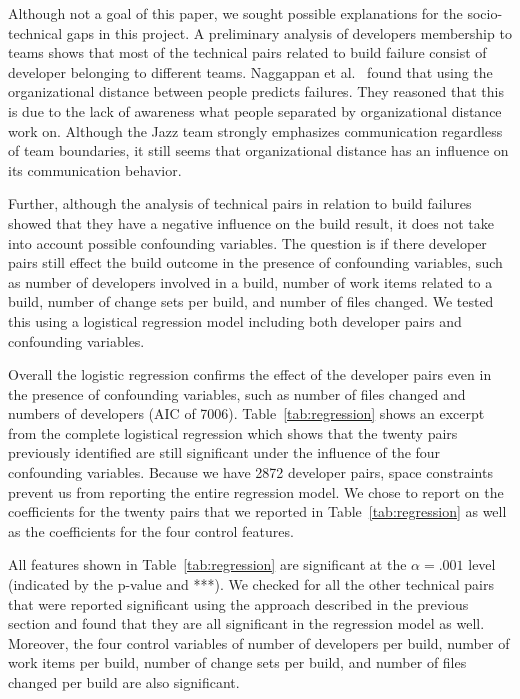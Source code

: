 Although not a goal of this paper, we sought possible explanations for the
socio-technical gaps in this project. A preliminary analysis of developers
membership to teams shows that most
of the technical pairs related to build failure consist of developer belonging to
different teams. Naggappan et al.~\cite{nagappan:icse:2008} found that using the
organizational distance between people predicts failures. They reasoned that this
is due to the lack of awareness what people separated by organizational distance
work on. Although the Jazz team strongly emphasizes communication
regardless of team boundaries, it still seems that organizational distance has
an influence on its communication behavior.

Further, although the analysis of technical pairs in relation to build failures
showed that they have a negative influence on the build result, it does not take
into account possible confounding variables. The question is if there developer pairs still effect the build outcome in the presence of confounding variables, such as number of developers involved in a build, number of work items
related to a build, number of change sets per build, and number of files changed.
We tested this using a logistical regression model including both developer pairs and confounding variables.

Overall the logistic regression confirms the effect of the developer pairs
even in the presence of confounding variables, such as number of files changed
and numbers of developers (AIC of 7006). 
Table~\ref{tab:regression} shows an excerpt from the complete logistical
regression which shows that the twenty pairs previously identified are still
significant under the influence of the four confounding variables. Because we have 2872 developer pairs, space constraints prevent us from reporting the entire regression model. We chose to report on the coefficients for the twenty pairs that we reported in Table~\ref{tab:regression} as well as the coefficients for the four control features.

All features shown in Table~\ref{tab:regression} are significant at the $\alpha=.001$ level (indicated by the p-value and ***).
We checked for all the other technical pairs that were reported significant using the approach described in the previous section and found that they are all significant in the regression model as well.
Moreover, the four control variables of number of developers per build, number
of work items per build, number of change sets per build, and number of files changed per build are also significant.

